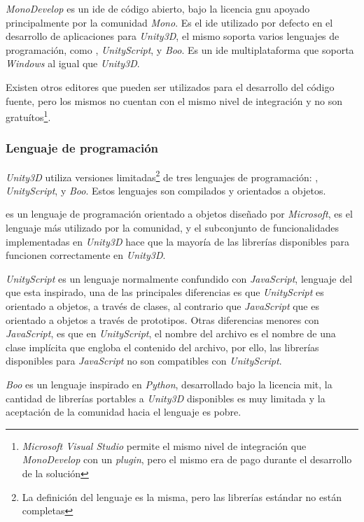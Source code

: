 \textit{MonoDevelop} es un \Gls{ide} de código abierto, bajo la licencia
\Gls{gnu} apoyado principalmente por la comunidad \textit{Mono}. Es el \Gls{ide}
utilizado por defecto en el desarrollo de aplicaciones para \textit{Unity3D}, el
mismo soporta varios lenguajes de programación, como \cs{},
\textit{UnityScript}, y \textit{Boo}. Es un \Gls{ide} multiplataforma que
soporta \textit{Windows} al igual que \textit{Unity3D}.

Existen otros editores que pueden ser utilizados para el desarrollo del código
fuente, pero los mismos no cuentan con el mismo nivel de integración y no son
gratuítos\footnote{\textit{Microsoft Visual Studio} permite el mismo nivel de
    integración que \textit{MonoDevelop} con un \textit{plugin}, pero el mismo
    era de pago durante el desarrollo de la solución}.

\subsubsection{Lenguaje de programación}

\textit{Unity3D} utiliza versiones limitadas\footnote{La definición del lenguaje
    es la misma, pero las librerías estándar no están completas} de tres
lenguajes de programación: \cs{}, \textit{UnityScript}, y
\textit{Boo}\cite{unity:script}. Estos lenguajes son compilados y orientados a
objetos.

\cs{} es un lenguaje de programación orientado a objetos diseñado por
\textit{Microsoft}, es el lenguaje más utilizado por la comunidad, y el
subconjunto de funcionalidades implementadas en \textit{Unity3D} hace que la
mayoría de las librerías disponibles para \cs{} funcionen correctamente en
\textit{Unity3D}.

\textit{UnityScript} es un lenguaje normalmente confundido con
\textit{JavaScript}, lenguaje del que esta inspirado, una de las principales
diferencias es que \textit{UnityScript} es orientado a objetos, a través de
clases, al contrario que \textit{JavaScript} que es orientado a objetos a través
de prototipos. Otras diferencias menores con \textit{JavaScript}, es que en
\textit{UnityScript}, el nombre del archivo es el nombre de una clase implícita
que engloba el contenido del archivo\cite{us_vs_js}, por ello, las librerías
disponibles para \textit{JavaScript} no son compatibles con
\textit{UnityScript}.

\textit{Boo} es un lenguaje inspirado en \textit{Python}, desarrollado bajo la
licencia \Gls{mit}, la cantidad de librerías portables a \textit{Unity3D}
disponibles es muy limitada y la aceptación de la comunidad hacia el lenguaje es
pobre.

